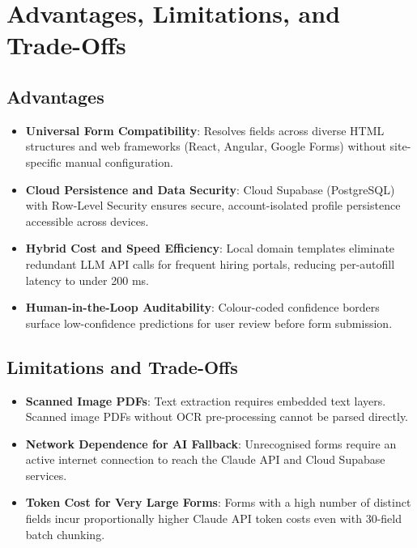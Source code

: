 \documentclass[12pt,a4paper]{report}
\begin{document}
\chapter{Advantages, Limitations, and Trade-Offs}
\label{ch:advantages_detail}

\section{Advantages}
\begin{itemize}
    \item \textbf{Universal Form Compatibility}: Resolves fields across diverse HTML structures and web frameworks (React, Angular, Google Forms) without site-specific manual configuration.
    \item \textbf{Cloud Persistence and Data Security}: Cloud Supabase (PostgreSQL) with Row-Level Security ensures secure, account-isolated profile persistence accessible across devices.
    \item \textbf{Hybrid Cost and Speed Efficiency}: Local domain templates eliminate redundant LLM API calls for frequent hiring portals, reducing per-autofill latency to under 200 ms.
    \item \textbf{Human-in-the-Loop Auditability}: Colour-coded confidence borders surface low-confidence predictions for user review before form submission.
\end{itemize}

\section{Limitations and Trade-Offs}
\begin{itemize}
    \item \textbf{Scanned Image PDFs}: Text extraction requires embedded text layers. Scanned image PDFs without OCR pre-processing cannot be parsed directly.
    \item \textbf{Network Dependence for AI Fallback}: Unrecognised forms require an active internet connection to reach the Claude API and Cloud Supabase services.
    \item \textbf{Token Cost for Very Large Forms}: Forms with a high number of distinct fields incur proportionally higher Claude API token costs even with 30-field batch chunking.
\end{itemize}

\end{document}
